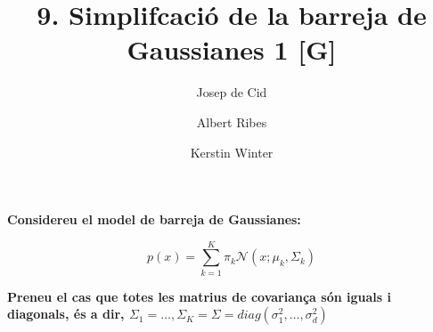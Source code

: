 \documentclass[a5paper]{article}
\title{9. Simplifcació de la barreja de Gaussianes 1 [G]}
\author{
Josep de Cid
\and Albert Ribes
\and Kerstin Winter
}
\begin{document}
\maketitle

%


\textbf{
Considereu el model de barreja de Gaussianes:
}

\begin{equation*}
p(x) = \sum_{k = 1}^{K} \pi_k \mathcal{N}(x; \mu_k, \Sigma_k)
\end{equation*}

\textbf{
Preneu el cas que totes les matrius de covariança són iguals i diagonals, és a dir, $\Sigma_1 = \dots, \Sigma_K = \Sigma = diag(\sigma_1^2,\dots, \sigma_d^2)$
}
\end{document}
